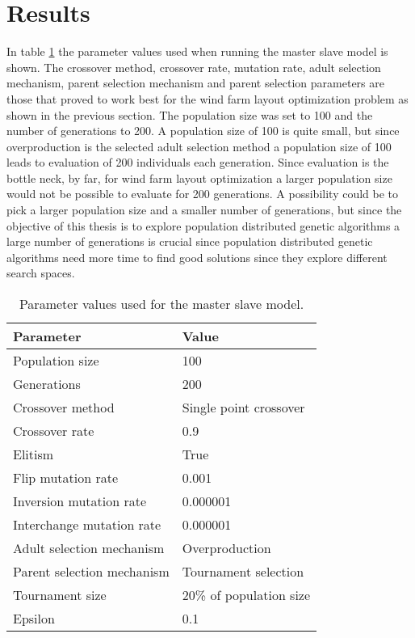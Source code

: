 \documentclass[12pt]{report}
\begin{document}
\section{Results}\label{section:results}
\noindent In table \ref{table:final parameter settings master slave model} the parameter values used when running the master slave model is shown. The crossover method, crossover rate, mutation rate, adult selection mechanism, parent selection mechanism and parent selection parameters are those that proved to work best for the wind farm layout optimization problem as shown in the previous section. The population size was set to 100 and the number of generations to 200. A population size of 100 is quite small, but since overproduction is the selected adult selection method a population size of 100 leads to evaluation of 200 individuals each generation. Since evaluation is the bottle neck, by far, for wind farm layout optimization a larger population size would not be possible to evaluate for 200 generations. A possibility could be to pick a larger population size and a smaller number of generations, but since the objective of this thesis is to explore population distributed genetic algorithms a large number of generations is crucial since population distributed genetic algorithms need more time to find good solutions since they explore different search spaces. \\


\begin{table}
\centering
\caption{Parameter values used for the master slave model.}
\label{table:final parameter settings master slave model}
\begin{tabular}{l|l}
\textbf{Parameter} & \textbf{Value} \\ 
\hline 
Population size & 100 \\  
Generations & 200 \\ 
Crossover method & Single point crossover \\ 
Crossover rate & 0.9 \\ 
Elitism & True \\ 
Flip mutation rate & 0.001 \\ 
Inversion mutation rate & 0.000001 \\ 
Interchange mutation rate & 0.000001 \\ 
Adult selection mechanism & Overproduction \\ 
Parent selection mechanism & Tournament selection \\ 
Tournament size & 20\% of population size\\ 
Epsilon & 0.1 \\ 
\end{tabular} 
\end{table}
\end{document}
